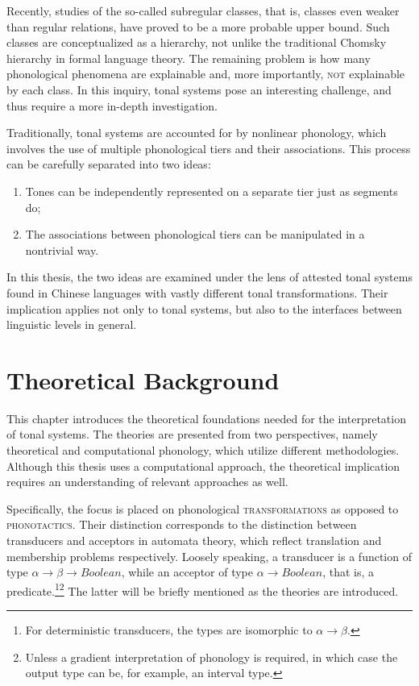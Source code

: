 \documentclass[12pt, a4paper]{report}
\newcommand{\textemph}[1]{\textsc{#1}}
\newcommand{\textterm}[1]{\textsc{#1}\index{#1}}
\begin{document}
Recently, studies of the so-called subregular classes, that is,
classes even weaker than regular relations, have proved to be a more
probable upper bound.  Such classes are conceptualized as a hierarchy,
not unlike the traditional Chomsky hierarchy in formal language
theory.  The remaining problem is how many phonological phenomena are
explainable and, more importantly, \textemph{not} explainable by each
class.  In this inquiry, tonal systems pose an interesting challenge,
and thus require a more in-depth investigation.

Traditionally, tonal systems are accounted for by nonlinear phonology,
which involves the use of multiple phonological tiers and their
associations.  This process can be carefully separated into two ideas:
%
\begin{enumerate}
\item Tones can be independently represented on a separate tier just
  as segments do;
\item The associations between phonological tiers can be manipulated
  in a nontrivial way.
\end{enumerate}
%
In this thesis, the two ideas are examined under the lens of attested
tonal systems found in Chinese languages with vastly different tonal
transformations.  Their implication applies not only to tonal systems,
but also to the interfaces between linguistic levels in general.

\tableofcontents

\cleardoublepage
{}

\chapter{Theoretical Background}
This chapter introduces the theoretical foundations needed for the
interpretation of tonal systems.  The theories are presented from two
perspectives, namely theoretical and computational phonology, which
utilize different methodologies.  Although this thesis uses a
computational approach, the theoretical implication requires an
understanding of relevant approaches as well.

Specifically, the focus is placed on phonological
\textterm{transformations} as opposed to \textterm{phonotactics}.
Their distinction corresponds to the distinction between transducers
and acceptors in automata theory, which reflect translation and
membership problems respectively.  Loosely speaking, a transducer is a
function of type \(\alpha \to \beta \to \mathit{Boolean}\), while an
acceptor of type \(\alpha \to \mathit{Boolean}\), that is, a
predicate.\footnote{For deterministic transducers, the types are
  isomorphic to \(\alpha \to \beta\).}\footnote{Unless a gradient
  interpretation of phonology is required, in which case the output
  type can be, for example, an interval type.}  The latter will be
briefly mentioned as the theories are introduced.
\end{document}

